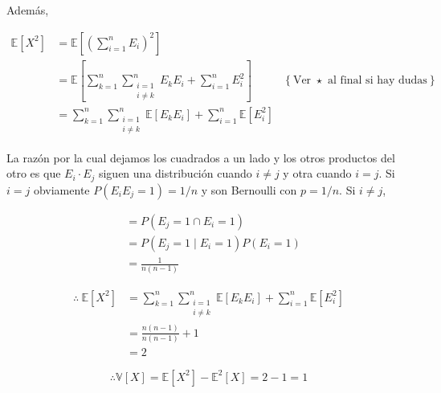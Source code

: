 \documentclass[a4paper, 12pt]{article}
\begin{document}
Además,

\begin{align*}
  \mathbb{E}\left[ X^2 \right]  
  &= \mathbb{E}\left[ \left( \sum_{i=1}^n E_i
  \right)^2  \right] \\ 
  &= \mathbb{E}\left[ \sum_{k=1}^n\sum_{\substack{i=1\\i \neq k}}^n E_kE_i  +  \sum_{i=1}^n
E^2_{i}  \right] &\left\{ \text{Ver } \star \text{ al final si hay dudas} \right\} 
  \\ 
  &= \sum_{k=1}^n\sum_{\substack{i=1\\i \neq k}}^n \mathbb{E}\left[ E_k E_i \right] +
  \sum_{i=1}^n \mathbb{E}\left[ E_i^2 \right] 
\end{align*}

La razón por la cual dejamos los cuadrados a un lado y los otros productos del
otro es que $E_{i} \cdot E_j$ siguen una distribución cuando $i \neq j$ y otra
cuando $i = j$. Si $i = j$ obviamente $P(E_i E_j = 1) = 1 / n$ y son Bernoulli
con $p = 1 / n$. Si $i \neq j$,

\begin{align*}
  &= P(E_j = 1 \cap  E_i = 1) \\ 
  &=P(E_j = 1 \mid E_i = 1)P(E_i = 1) \\ 
  &= \frac{1}{n(n-1)}
\end{align*}

\begin{align*}
  \therefore  ~ \mathbb{E}\left[ X^2 \right]  
  &= \sum_{k=1}^n\sum_{\substack{i=1\\i \neq k}}^n \mathbb{E}\left[ E_k E_i \right] + \sum_{i=1}^n
  \mathbb{E}\left[ E_i^2 \right] \\
  &=\frac{n(n -1)}{n(n-1)} + 1\\ 
  &= 2
\end{align*}

\begin{equation*}
  \therefore \mathbb{V}\left[ X \right] = \mathbb{E}\left[ X^2 \right] -
  \mathbb{E}^2\left[ X \right] = 2 - 1 = 1
\end{equation*}
\end{document}
